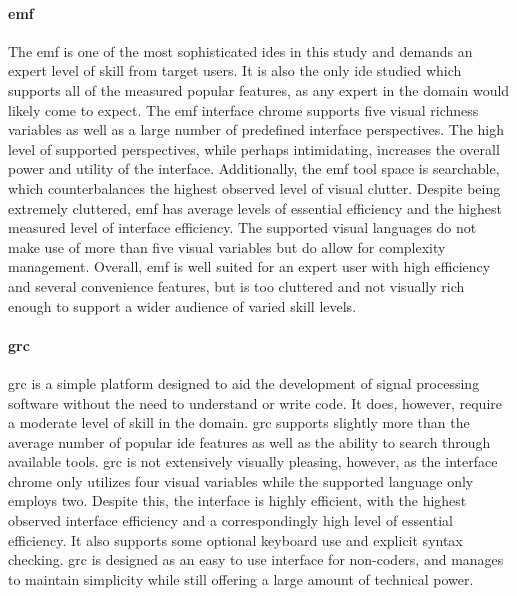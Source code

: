 \paragraph{\acl{emf}} The \ac{emf} is one of the most sophisticated
\acp{ide} in this study and demands an expert level of skill from target
users. It is also the only \ac{ide} studied which supports all of the
measured popular features, as any expert in the domain would likely come to
expect. The \ac{emf} interface chrome supports five visual richness
variables as well as a large number of predefined interface perspectives.
The high level of supported perspectives, while perhaps intimidating,
increases the overall power and utility of the interface. Additionally, the
\ac{emf} tool space is searchable, which counterbalances the highest
observed level of visual clutter. Despite being extremely cluttered,
\ac{emf} has average levels of essential efficiency and the highest
measured level of interface efficiency. The supported visual languages do
not make use of more than five visual variables but do allow for complexity
management. Overall, \ac{emf} is well suited for an expert user with high
efficiency and several convenience features, but is too cluttered and not
visually rich enough to support a wider audience of varied skill levels.

\paragraph{\acl{grc}} \acl{grc} is a simple platform designed to aid the
development of signal processing software without the need to understand or
write code. It does, however, require a moderate level of skill in the
domain. \ac{grc} supports slightly more than the average number of popular
\ac{ide} features as well as the ability to search through available tools.
\ac{grc} is not extensively visually pleasing, however, as the interface
chrome only utilizes four visual variables while the supported language
only employs two. Despite this, the interface is highly efficient, with the
highest observed interface efficiency and a correspondingly high level of
essential efficiency. It also supports some optional keyboard use and
explicit syntax checking. \ac{grc} is designed as an easy to use interface
for non-coders, and manages to maintain simplicity while still offering a
large amount of technical power.

